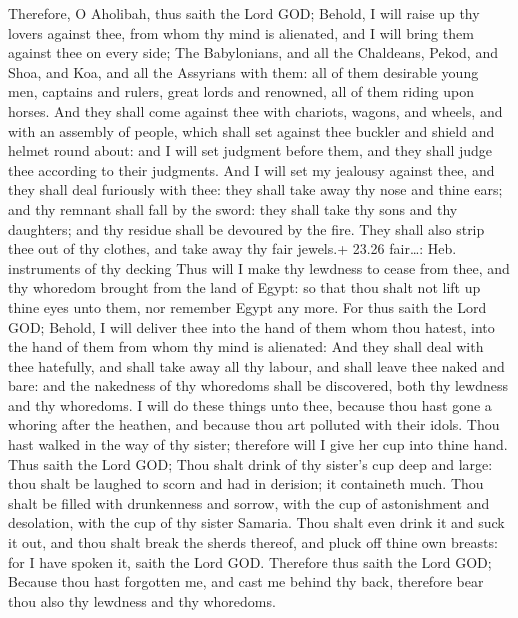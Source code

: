  Therefore, O Aholibah, thus saith the Lord GOD; Behold,
I will raise up thy lovers against thee, from whom thy mind is
alienated, and I will bring them against thee on every side;
 The Babylonians, and all the Chaldeans, Pekod, and Shoa,
and Koa, and all the Assyrians with them: all of them desirable young
men, captains and rulers, great lords and renowned, all of them riding
upon horses.  And they shall come against thee with
chariots, wagons, and wheels, and with an assembly of people, which
shall set against thee buckler and shield and helmet round about: and I
will set judgment before them, and they shall judge thee according to
their judgments.  And I will set my jealousy against thee,
and they shall deal furiously with thee: they shall take away thy nose
and thine ears; and thy remnant shall fall by the sword: they shall take
thy sons and thy daughters; and thy residue shall be devoured by the
fire.  They shall also strip thee out of thy clothes, and
take away thy fair jewels.+ 23.26 fair\ldots: Heb. instruments of thy
decking  Thus will I make thy lewdness to cease from thee,
and thy whoredom brought from the land of Egypt: so that thou shalt not
lift up thine eyes unto them, nor remember Egypt any more. 
For thus saith the Lord GOD; Behold, I will deliver thee into the hand
of them whom thou hatest, into the hand of them from whom thy mind is
alienated:  And they shall deal with thee hatefully, and
shall take away all thy labour, and shall leave thee naked and bare: and
the nakedness of thy whoredoms shall be discovered, both thy lewdness
and thy whoredoms.  I will do these things unto thee,
because thou hast gone a whoring after the heathen, and because thou art
polluted with their idols.  Thou hast walked in the way of
thy sister; therefore will I give her cup into thine hand. 
Thus saith the Lord GOD; Thou shalt drink of thy sister's cup deep and
large: thou shalt be laughed to scorn and had in derision; it containeth
much.  Thou shalt be filled with drunkenness and sorrow,
with the cup of astonishment and desolation, with the cup of thy sister
Samaria.  Thou shalt even drink it and suck it out, and
thou shalt break the sherds thereof, and pluck off thine own breasts:
for I have spoken it, saith the Lord GOD.  Therefore thus
saith the Lord GOD; Because thou hast forgotten me, and cast me behind
thy back, therefore bear thou also thy lewdness and thy whoredoms.

